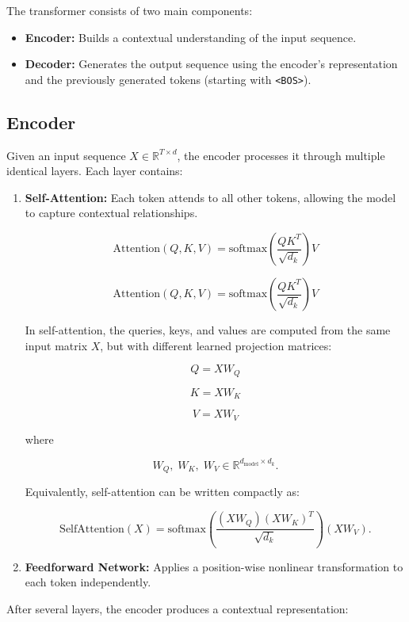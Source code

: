 \documentclass[12pt]{extarticle}
\begin{document}
The transformer consists of two main components:

\begin{itemize}
\item \textbf{Encoder:} Builds a contextual understanding of the input sequence.
\item \textbf{Decoder:} Generates the output sequence using the encoder's representation and the previously generated tokens (starting with \texttt{<BOS>}).
\end{itemize}

\subsection{Encoder}

Given an input sequence \( X \in \mathbb{R}^{T \times d} \), the encoder processes it through multiple identical layers. Each layer contains:

\begin{enumerate}
\item \textbf{Self-Attention:}  
Each token attends to all other tokens, allowing the model to capture contextual relationships.

\[
\text{Attention}(Q,K,V) = \text{softmax}\left(\frac{QK^T}{\sqrt{d_k}}\right)V
\]

\[
\text{Attention}(Q,K,V) =
\text{softmax}\left(\frac{QK^T}{\sqrt{d_k}}\right)V
\]

In self-attention, the queries, keys, and values are computed from the same input matrix \(X\), but with different learned projection matrices:

\[
Q = XW_Q
\]

\[
K = XW_K
\]

\[
V = XW_V
\]

where

\[
W_Q,\; W_K,\; W_V \in \mathbb{R}^{d_{\text{model}} \times d_k}.
\]

Equivalently, self-attention can be written compactly as:

\[
\text{SelfAttention}(X)
=
\text{softmax}
\left(
\frac{(XW_Q)(XW_K)^T}{\sqrt{d_k}}
\right)
(XW_V).
\]

\item \textbf{Feedforward Network:}  
Applies a position-wise nonlinear transformation to each token independently.

\end{enumerate}

After several layers, the encoder produces a contextual representation:
\end{document}
